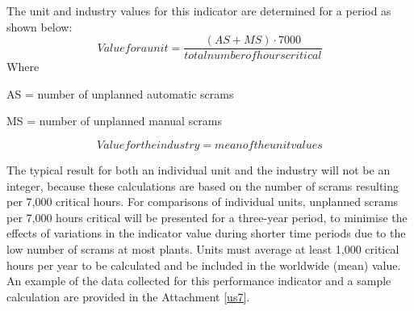 The unit and industry values for this indicator are determined for a period as shown below:
$$ Value for a unit = \frac{(AS+MS) \cdot 7000}{total number of hours critical} $$
Where   

AS = number of unplanned automatic scrams 

MS = number of unplanned manual scrams

$$ Value for the industry = mean of the unit values $$

The typical result for both an individual unit and the industry will not be an integer, because these calculations are based on the number of scrams resulting per 7,000 critical hours. For comparisons of individual units, unplanned scrams per 7,000 hours critical will be presented for a three-year period, to minimise the effects of variations in the indicator value during shorter time periods due to the low number of scrams at most plants. Units must average at least 1,000 critical hours per year to be calculated and be included in the worldwide (mean) value.
An example of the data collected for this performance indicator and a
sample calculation are provided in the Attachment \ref{us7}.

